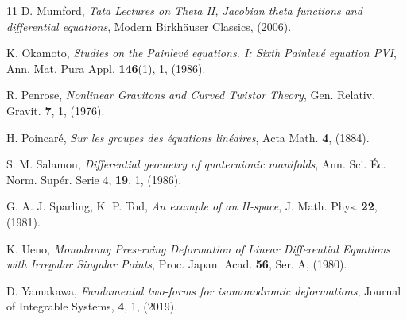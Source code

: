 \documentclass[a4paper,12pt,reqno]{amsart}
\numberwithin{equation}{section}
\numberwithin{counter2}{section}
\begin{document}
\begin{thebibliography}{11}
 D.  Mumford,  
{\em Tata Lectures on Theta II,  Jacobian theta functions and differential equations},  
Modern Birkhäuser Classics,  (2006).

 K. Okamoto,  
{\em Studies on the Painlev\'{e} equations.  I: Sixth Painlev\'{e} equation PVI},
Ann.  Mat.  Pura Appl.  \textbf{146}(1),  1,  (1986). 

 R.  Penrose,
{\em Nonlinear Gravitons and Curved Twistor Theory},
Gen.  Relativ.  Gravit.  {\bf 7},  1,  (1976).

 H.  Poincar\'{e}, 
{\em Sur les groupes des \'{e}quations lin\'{e}aires},
Acta Math.  {\bf 4},  (1884). 

 S. M.  Salamon,  
{\em Differential geometry of quaternionic manifolds}, 
Ann.  Sci.  Éc.  Norm.  Supér.  Serie 4,  \textbf{19},  1,  (1986).  

 G. A. J.  Sparling,  K. P. Tod,
{\em An example of an H‐space},
 J.  Math.  Phys.  {\bf 22},  (1981). 

 K.  Ueno,
{\em Monodromy Preserving Deformation of Linear Differential Equations with Irregular Singular Points},
Proc.  Japan.  Acad.  \textbf{56},  Ser. A,  (1980).  

 D.  Yamakawa,
{\em Fundamental two-forms for isomonodromic deformations}, 
Journal of Integrable Systems,  \textbf{4},  1, (2019). 

%
%


\end{thebibliography}
\end{document}
